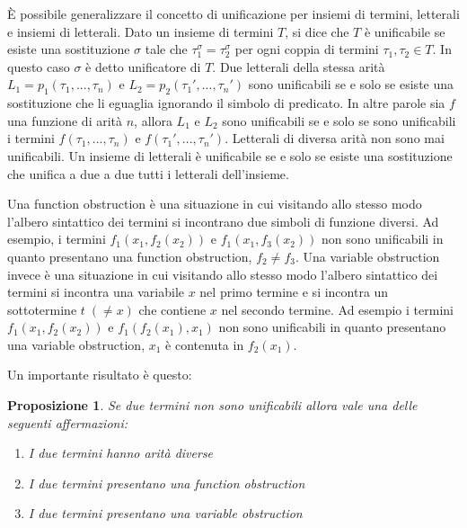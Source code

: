 \documentclass[./main.tex]{subfiles}
\begin{document}
È possibile generalizzare il concetto di unificazione per insiemi di termini, letterali e insiemi di letterali.
Dato un insieme di termini $T$, si dice che $T$ è unificabile se esiste una sostituzione $\sigma$ tale che $\tau_1^\sigma = \tau_2^\sigma$
per ogni coppia di termini $\tau_1, \tau_2 \in T$. In questo caso $\sigma$ è detto unificatore di $T$. 
Due letterali della stessa arità $L_1 = p_1(\tau_1, ..., \tau_n)$ e $L_2 = p_2(\tau_1', ..., \tau_n')$ 
sono unificabili se e solo se esiste una sostituzione che li eguaglia ignorando il simbolo di predicato.
In altre parole sia $f$ una funzione di arità $n$, allora $L_1$ e $L_2$ sono unificabili se e solo se sono unificabili i termini
$f(\tau_1, ..., \tau_n)$ e $f(\tau_1', ..., \tau_n')$.
Letterali di diversa arità non sono mai unificabili.
Un insieme di letterali è unificabile se e solo se esiste una sostituzione che unifica a due a due tutti i letterali dell'insieme.

Una function obstruction è una situazione in cui visitando allo stesso modo l'albero sintattico dei termini si incontrano
due simboli di funzione diversi. Ad esempio, i termini $f_1(x_1, f_2(x_2))$ e $f_1(x_1, f_3(x_2))$ non sono unificabili in quanto
presentano una function obstruction, $f_2 \neq f_3$. Una variable obstruction invece è una situazione in cui visitando allo stesso modo
l'albero sintattico dei termini si incontra una variabile $x$ nel primo termine 
e si incontra un sottotermine $t \; (\neq x)$ che contiene $x$ nel secondo termine. Ad esempio i termini $f_1(x_1, f_2(x_2))$ e $f_1(f_2(x_1), x_1)$
non sono unificabili in quanto presentano una variable obstruction, $x_1$ è contenuta in $f_2(x_1)$.

Un importante risultato è questo:
\newtheorem{proposition}{Proposizione}
\begin{proposition}
  Se due termini non sono unificabili allora vale una delle seguenti affermazioni:
  \begin{enumerate}
    \item I due termini hanno arità diverse
    \item I due termini presentano una function obstruction 
    \item I due termini presentano una variable obstruction
  \end{enumerate}
\end{proposition}
\end{document}
